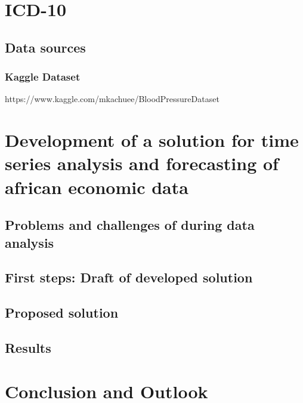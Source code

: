              
\chapter{ICD-10 }\label{african_eco_hist}

\section{Data sources}\label{datasource}

\subsection{Kaggle Dataset}

https://www.kaggle.com/mkachuee/BloodPressureDataset



\chapter{Development of a solution for time series analysis and forecasting of african economic data}\label{development}
\section{Problems and challenges of during data analysis}\label{problems_challenges}

\section{First steps: Draft of developed solution}\label{draft}

\section{Proposed solution}\label{proposed_solution}

\section{Results}\label{results}

\chapter{Conclusion and Outlook}\label{conclusion_outlook}
